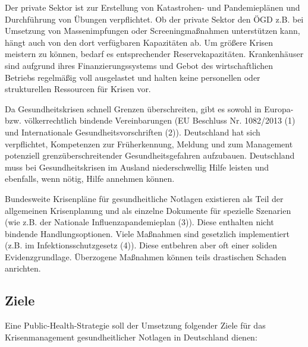 \documentclass{article}
\begin{document}
Der private Sektor ist zur Erstellung von Katastrohen- und Pandemieplänen und Durchführung von Übungen verpflichtet. Ob der private Sektor den ÖGD z.B. bei Umsetzung von Massenimpfungen oder Screeningmaßnahmen unterstützen kann, hängt auch von den dort verfügbaren Kapazitäten ab. Um größere Krisen meistern zu können, bedarf es entsprechender Reservekapazitäten. Krankenhäuser sind aufgrund ihres Finanzierungssystems und Gebot des wirtschaftlichen Betriebs regelmäßig voll ausgelastet und halten keine personellen oder strukturellen Ressourcen für Krisen vor.


Da Gesundheitskrisen schnell Grenzen überschreiten, gibt es sowohl in Europa- bzw. völkerrechtlich bindende Vereinbarungen (EU Beschluss Nr. 1082/2013 (1) und Internationale Gesundheits­vorschriften (2)). Deutschland hat sich verpflichtet, Kompetenzen zur Früherkennung, Meldung und zum Management potenziell grenzüberschreitender Gesundheitsgefahren aufzubauen. Deutschland muss bei Gesundheitskrisen im Ausland niederschwellig Hilfe leisten und ebenfalls, wenn nötig, Hilfe annehmen können.


Bundesweite Krisenpläne für gesundheitliche Notlagen existieren als Teil der allgemeinen Krisen­planung und als einzelne Dokumente für spezielle Szenarien (wie z.B. der Nationale Influenza­pandemieplan (3)). Diese enthalten nicht bindende Handlungsoptionen. Viele Maßnahmen sind gesetzlich implementiert (z.B. im Infektionsschutzgesetz (4)). Diese entbehren aber oft einer soliden Evidenzgrundlage. Überzogene Maßnahmen können teils drastischen Schaden anrichten. 


\subsection{Ziele}\label{H6084705}



Eine Public-Health-Strategie soll der Umsetzung folgender Ziele für das Krisenmanagement gesundheitlicher Notlagen in Deutschland dienen: 
\end{document}
